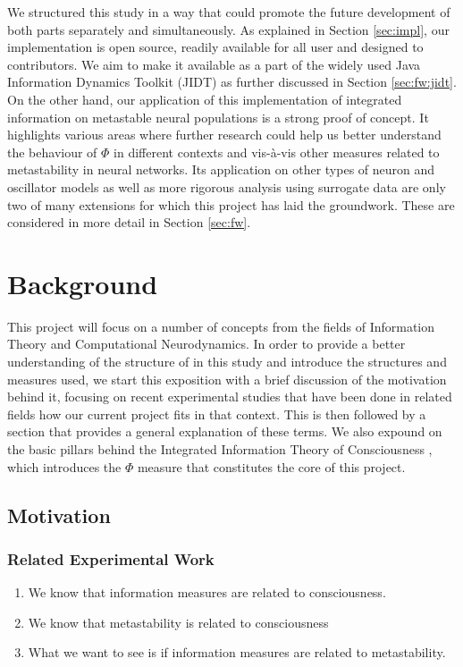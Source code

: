 \documentclass[a4paper,11pt]{article}
\begin{document}
We structured this study in a way that could promote the future development of both parts separately and simultaneously. As explained in Section \ref{sec:impl}, our implementation is open source, readily available for all user and designed to contributors. We aim to make it available as a part of the widely used Java Information Dynamics Toolkit (JIDT) \cite{Lizier2014} as further discussed in Section \ref{sec:fw:jidt}. On the other hand, our application of this implementation of integrated information on metastable neural populations is a strong proof of concept. It highlights various areas where further research could help us better understand the behaviour of $\Phi$ in different contexts and vis-\`{a}-vis other measures related to metastability in neural networks. Its application on other types of neuron and oscillator models as well as more rigorous analysis using surrogate data are only two of many extensions for which this project has laid the groundwork. These are considered in more detail in Section \ref{sec:fw}.

\clearpage

\section{Background}
\label{sec:bg}
This project will focus on a number of concepts from the fields of Information Theory and Computational Neurodynamics. In order to provide a better understanding of the structure of in this study and introduce the structures and measures used, we start this exposition with a brief discussion of the motivation behind it, focusing on recent experimental studies that have been done in related fields how our current project fits in that context. This is then followed by a section that provides a general explanation of these terms. We also expound on the basic pillars behind the Integrated Information Theory of Consciousness \cite{Tononi2008a}, which introduces the $\Phi$ measure that constitutes the core of this project.

\subsection{Motivation}

\subsubsection{Related Experimental Work}
\begin{enumerate}
\item{We know that information measures are related to consciousness.}
\item{We know that metastability is related to consciousness}
\item{What we want to see is if information measures are related to metastability.}
\end{enumerate}
\end{document}
